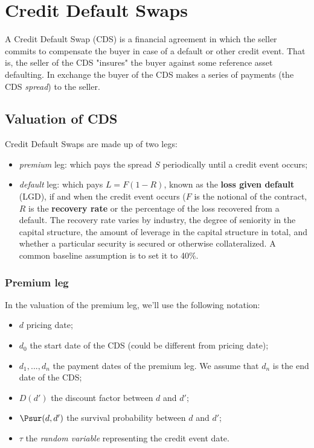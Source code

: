 \section{Credit Default Swaps}
\label{sec:credit-default-swaps}

A Credit Default Swap (CDS) is a financial agreement in which the seller commits to compensate the buyer in case of a default or other credit event. That is, the seller of the CDS "insures" the buyer against some reference asset defaulting. In exchange the buyer of the CDS makes a series of payments (the CDS \emph{spread}) to the seller.

\subsection{Valuation of CDS}
\label{sec:cds_valuation}

Credit Default Swaps are made up of two legs:

\begin{itemize}
\tightlist
\item \emph{premium} leg: which pays the spread $S$ periodically until a credit event occurs;
\item \emph{default} leg: which pays $L = F(1 - R)$, known as the \textbf{loss given default} (LGD), if and when the credit event occurs ($F$ is the notional of the contract, $R$ is the \textbf{recovery rate} or the percentage of the loss recovered from a default. The recovery rate varies by industry, the degree of seniority in the capital structure, the amount of leverage in the capital structure in total, and whether a particular security is secured or otherwise collateralized. A common baseline assumption is to set it to 40\%.
\end{itemize}

\subsubsection{Premium leg}\label{premium-leg}

In the valuation of the premium leg, we'll use the following notation:

\begin{itemize}
\tightlist
\item $d$ pricing date;
\item $d_0$ the start date of the CDS (could be different from pricing date);
\item $d_1, ..., d_n$ the payment dates of the premium leg. We assume that $d_n$ is the end date of the CDS;
\item $D(d')$ the discount factor between $d$ and $d'$;
\item $\Psur(d, d')$ the survival probability between $d$ and $d'$;
\item $\tau$ the \emph{random variable} representing the credit event date.
\end{itemize}

